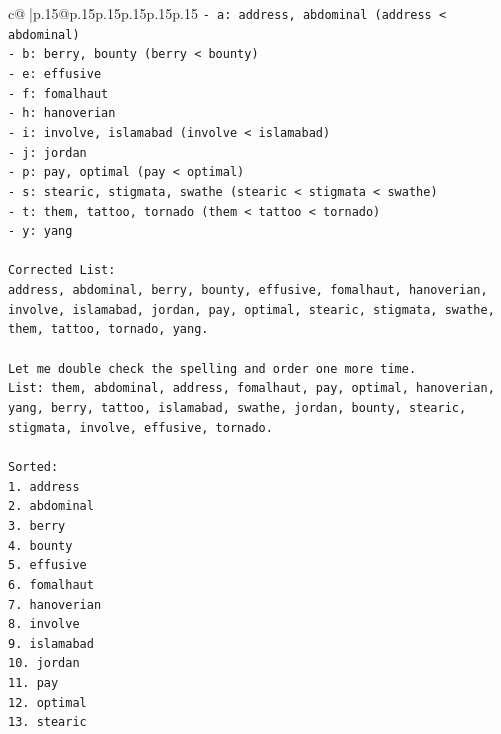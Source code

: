 \documentclass{article}
\begin{document}
{\begin{supertabular}{c@{$\;$}|p{.15\linewidth}@{}p{.15\linewidth}p{.15\linewidth}p{.15\linewidth}p{.15\linewidth}p{.15\linewidth}}
{{{\texttt{{-}   a: address, abdominal (address < abdominal)} \\
\texttt{{-}   b: berry, bounty (berry < bounty)} \\
\texttt{{-}   e: effusive} \\
\texttt{{-}   f: fomalhaut} \\
\texttt{{-}   h: hanoverian} \\
\texttt{{-}   i: involve, islamabad (involve < islamabad)} \\
\texttt{{-}   j: jordan} \\
\texttt{{-}   p: pay, optimal (pay < optimal)} \\
\texttt{{-}   s: stearic, stigmata, swathe (stearic < stigmata < swathe)} \\
\texttt{{-}   t: them, tattoo, tornado (them < tattoo < tornado)} \\
\texttt{{-}   y: yang} \\
\\ 
\texttt{Corrected List:} \\
\texttt{address, abdominal, berry, bounty, effusive, fomalhaut, hanoverian, involve, islamabad, jordan, pay, optimal, stearic, stigmata, swathe, them, tattoo, tornado, yang.} \\
\\ 
\texttt{Let me double check the spelling and order one more time.} \\
\texttt{List: them, abdominal, address, fomalhaut, pay, optimal, hanoverian, yang, berry, tattoo, islamabad, swathe, jordan, bounty, stearic, stigmata, involve, effusive, tornado.} \\
\\ 
\texttt{Sorted:} \\
\texttt{1.  address} \\
\texttt{2.  abdominal} \\
\texttt{3.  berry} \\
\texttt{4.  bounty} \\
\texttt{5.  effusive} \\
\texttt{6.  fomalhaut} \\
\texttt{7.  hanoverian} \\
\texttt{8.  involve} \\
\texttt{9.  islamabad} \\
\texttt{10. jordan} \\
\texttt{11. pay} \\
\texttt{12. optimal} \\
\texttt{13. stearic} \\
}}}
\end{supertabular}}
\end{document}
